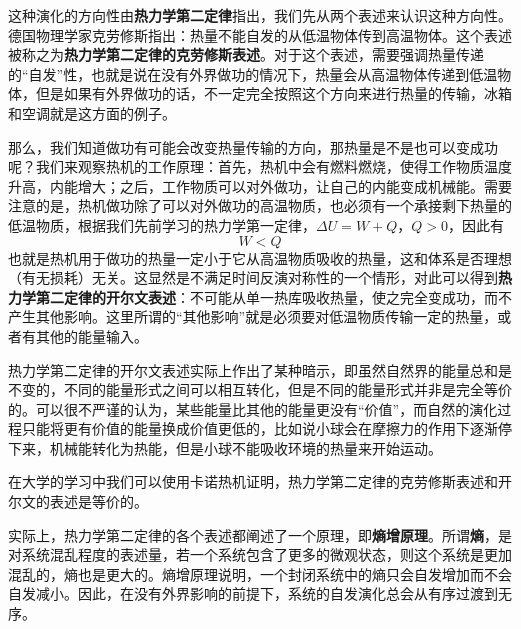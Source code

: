 这种演化的方向性由\textbf{热力学第二定律}指出，我们先从两个表述来认识这种方向性。德国物理学家克劳修斯指出：热量不能自发的从低温物体传到高温物体。这个表述被称之为\textbf{热力学第二定律的克劳修斯表述}。对于这个表述，需要强调热量传递的“自发”性，也就是说在没有外界做功的情况下，热量会从高温物体传递到低温物体，但是如果有外界做功的话，不一定完全按照这个方向来进行热量的传输，冰箱和空调就是这方面的例子。

那么，我们知道做功有可能会改变热量传输的方向，那热量是不是也可以变成功呢？我们来观察热机的工作原理：首先，热机中会有燃料燃烧，使得工作物质温度升高，内能增大；之后，工作物质可以对外做功，让自己的内能变成机械能。需要注意的是，热机做功除了可以对外做功的高温物质，也必须有一个承接剩下热量的低温物质，根据我们先前学习的热力学第一定律，$\Delta U=W+Q$，$Q>0$，因此有$$W<Q$$也就是热机用于做功的热量一定小于它从高温物质吸收的热量，这和体系是否理想（有无损耗）无关。这显然是不满足时间反演对称性的一个情形，对此可以得到\textbf{热力学第二定律的开尔文表述}：不可能从单一热库吸收热量，使之完全变成功，而不产生其他影响。这里所谓的“其他影响”就是必须要对低温物质传输一定的热量，或者有其他的能量输入。

热力学第二定律的开尔文表述实际上作出了某种暗示，即虽然自然界的能量总和是不变的，不同的能量形式之间可以相互转化，但是不同的能量形式并非是完全等价的。可以很不严谨的认为，某些能量比其他的能量更没有“价值”，而自然的演化过程只能将更有价值的能量换成价值更低的，比如说小球会在摩擦力的作用下逐渐停下来，机械能转化为热能，但是小球不能吸收环境的热量来开始运动。

在大学的学习中我们可以使用卡诺热机证明，热力学第二定律的克劳修斯表述和开尔文的表述是等价的。

实际上，热力学第二定律的各个表述都阐述了一个原理，即\textbf{熵增原理}。所谓\textbf{熵}，是对系统混乱程度的表述量，若一个系统包含了更多的微观状态，则这个系统是更加混乱的，熵也是更大的。熵增原理说明，一个封闭系统中的熵只会自发增加而不会自发减小。因此，在没有外界影响的前提下，系统的自发演化总会从有序过渡到无序。

